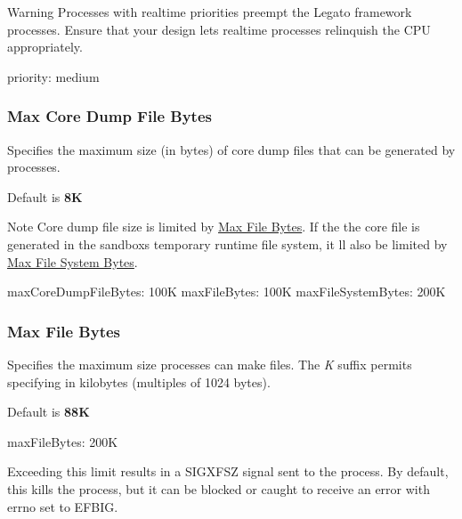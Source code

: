 \begin{DoxyWarning}{Warning}
Processes with realtime priorities preempt the Legato framework processes. Ensure that your design lets realtime processes relinquish the C\+P\+U appropriately.
\end{DoxyWarning}

\begin{DoxyCode}
priority: medium
\end{DoxyCode}
\hypertarget{def_files_adef_defFilesAdef_processMaxCoreDumpFileBytes}{}\subsubsection{Max Core Dump File Bytes}\label{def_files_adef_defFilesAdef_processMaxCoreDumpFileBytes}
Specifies the maximum size (in bytes) of core dump files that can be generated by processes.

Default is {\bfseries 8\+K} 

\begin{DoxyNote}{Note}
Core dump file size is limited by \hyperlink{def_files_adef_defFilesAdef_processMaxFileBytes}{Max File Bytes}. If the the core file is generated in the sandbox\textquotesingle{}s temporary runtime file system, it \textquotesingle{}ll also be limited by \hyperlink{def_files_adef_defFilesAdef_maxFileSystemBytes}{Max File System Bytes}.
\end{DoxyNote}

\begin{DoxyCode}
maxCoreDumpFileBytes: 100K
maxFileBytes: 100K
maxFileSystemBytes: 200K
\end{DoxyCode}
\hypertarget{def_files_adef_defFilesAdef_processMaxFileBytes}{}\subsubsection{Max File Bytes}\label{def_files_adef_defFilesAdef_processMaxFileBytes}
Specifies the maximum size processes can make files. The {\itshape K} suffix permits specifying in kilobytes (multiples of 1024 bytes).

Default is {\bfseries 88\+K} 


\begin{DoxyCode}
maxFileBytes: 200K
\end{DoxyCode}


Exceeding this limit results in a {\ttfamily S\+I\+G\+X\+F\+S\+Z} signal sent to the process. By default, this kills the process, but it can be blocked or caught to receive an error with {\ttfamily errno} set to {\ttfamily E\+F\+B\+I\+G}.


